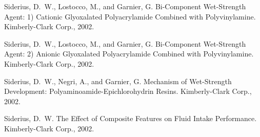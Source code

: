 Siderius, D.~W., Lostocco, M., and Garnier, G. Bi-Component Wet-Strength Agent: 1) Cationic Glyoxalated Polyacrylamide Combined with Polyvinylamine. Kimberly-Clark Corp., 2002.

Siderius, D.~W., Lostocco, M., and Garnier, G. Bi-Component Wet-Strength Agent: 2) Anionic Glyoxalated Polyacrylamide Combined with Polyvinylamine. Kimberly-Clark Corp., 2002.

Siderius, D.~W., Negri, A., and Garnier, G. Mechanism of Wet-Strength Development: Polyaminoamide-Epichlorohydrin Resins. Kimberly-Clark Corp., 2002.

Siderius, D.~W. The Effect of Composite Features on Fluid Intake Performance. Kimberly-Clark Corp., 2002.
